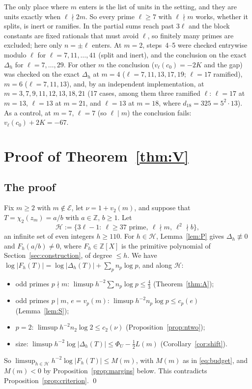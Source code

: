 \documentclass[11pt]{amsart}
\theoremstyle{definition}
\theoremstyle{remark}
\numberwithin{equation}{section}
\newcommand{\ZZ}{\mathbb{Z}}
\newcommand{\cE}{\mathcal{E}}
\begin{document}
The only place where $m$ enters is the list of units in the setting, and they are units exactly when $\ell\nmid2m$. So
every prime $\ell\ge7$ with $\ell\nmid m$ works, whether it splits, is inert or ramifies. In \cite{Chi2Paper} the partial
sums reach past $3\ell$ and the block constants are fixed rationals that must avoid $\ell$, so finitely many primes are
excluded; here only $n=\pm\ell$ enters. At $m=2$, steps~4--5 were checked entrywise modulo $\ell$ for $\ell=7,11,\dots,41$
(split and inert), and the conclusion on the exact $\Delta_h$ for $\ell=7,\dots,29$. For other $m$ the conclusion
($v_\ell(c_0)=-2K$ and the gap) was checked on the exact $\Delta_h$ at $m=4$ ($\ell=7,11,13,17,19$; $\ell=17$ ramified),
$m=6$ ($\ell=7,11,13$), and, by an independent implementation, at $m=3,7,9,11,12,13,18,21$ (17 cases, among them three
ramified $\ell$: $\ell=17$ at $m=13$, $\ell=13$ at $m=21$, and $\ell=13$ at $m=18$, where $d_{18}=325=5^2\cdot13$). As a
control, at $m=7$, $\ell=7$ (so $\ell\mid m$) the conclusion fails: $v_\ell(c_0)+2K=-67$.

\section{Proof of Theorem~\ref{thm:V}}\label{sec:proof}

\subsection{The proof}
Fix $m\ge2$ with $m\notin\cE$, let $\nu=1+v_2(m)$, and suppose that $T=\chi_2(z_m)=a/b$ with $a\in\ZZ$, $b\ge1$. Let
\[
  \mathcal H:=\{3\ell-1:\ \ell\ge37\text{ prime},\ \ell\nmid m,\ \ell^2\nmid b\},
\]
an infinite set of even integers $h\ge110$. For $h\in\mathcal H$, Lemma~\ref{lem:P} gives $\Delta_h\not\equiv0$ and
$F_h(a/b)\ne0$, where $F_h\in\ZZ[X]$ is the primitive polynomial of Section~\ref{sec:construction}, of degree $\le h$. We
have $\log|F_h(T)|=\log|\Delta_h(T)|+\sum_pn_p\log p$, and along $\mathcal H$:
\begin{itemize}
\item odd primes $p\nmid m$: $\limsup h^{-2}\sum n_p\log p\le\frac43$ (Theorem~\ref{thm:A});
\item odd primes $p\mid m$, $e=v_p(m)$: $\limsup h^{-2}n_p\log p\le c_p(e)$ (Lemma~\ref{lem:S});
\item $p=2$: $\limsup h^{-2}n_2\log2\le c_2(\nu)$ (Proposition~\ref{prop:ntwo});
\item size: $\limsup h^{-2}\log|\Delta_h(T)|\le\Phi_U-\frac12L(m)$ (Corollary~\ref{cor:shift}).
\end{itemize}
So $\limsup_{h\in\mathcal H}h^{-2}\log|F_h(T)|\le M(m)$, with $M(m)$ as in \eqref{eq:budget}, and $M(m)<0$ by
Proposition~\ref{prop:margins} below. This contradicts Proposition~\ref{prop:criterion}. \qed
\end{document}
